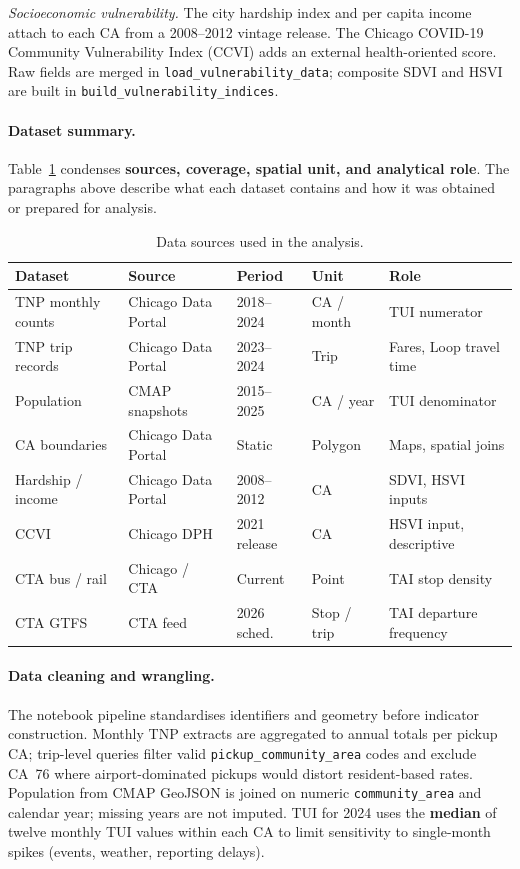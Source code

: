 \documentclass[10pt, a4paper]{article}
\begin{document}
\textit{Socioeconomic vulnerability.} The city hardship index and per capita income \cite{chicago_hardship} attach to each CA from a 2008--2012 vintage release. The Chicago COVID-19 Community Vulnerability Index (CCVI) \cite{chicago_ccvi} adds an external health-oriented score. Raw fields are merged in \texttt{load\_vulnerability\_data}; composite SDVI and HSVI are built in \texttt{build\_vulnerability\_indices}.

\paragraph{Dataset summary.}
Table~\ref{tab:datasets} condenses \textbf{sources, coverage, spatial unit, and analytical role}. The paragraphs above describe what each dataset contains and how it was obtained or prepared for analysis.

\begin{table}[htbp]
    \centering
    \caption{Data sources used in the analysis.}
    \label{tab:datasets}
    \small
    \begin{tabular}{|p{2.2cm}|p{2.5cm}|p{1.6cm}|p{1.4cm}|p{4.2cm}|}
        \hline
        \textbf{Dataset} & \textbf{Source} & \textbf{Period} & \textbf{Unit} & \textbf{Role} \\
        \hline
        TNP monthly counts & Chicago Data Portal & 2018--2024 & CA / month & TUI numerator \\
        TNP trip records & Chicago Data Portal & 2023--2024 & Trip & Fares, Loop travel time \\
        Population & CMAP snapshots & 2015--2025 & CA / year & TUI denominator \\
        CA boundaries & Chicago Data Portal & Static & Polygon & Maps, spatial joins \\
        Hardship / income & Chicago Data Portal & 2008--2012 & CA & SDVI, HSVI inputs \\
        CCVI & Chicago DPH & 2021 release & CA & HSVI input, descriptive \\
        CTA bus / rail & Chicago / CTA & Current & Point & TAI stop density \\
        CTA GTFS & CTA feed & 2026 sched. & Stop / trip & TAI departure frequency \\
        \hline
    \end{tabular}
\end{table}

\paragraph{Data cleaning and wrangling.}
The notebook pipeline standardises identifiers and geometry before indicator construction. Monthly TNP extracts are aggregated to annual totals per pickup CA; trip-level queries filter valid \texttt{pickup\_community\_area} codes and exclude CA~76 where airport-dominated pickups would distort resident-based rates. Population from CMAP GeoJSON is joined on numeric \texttt{community\_area} and calendar year; missing years are not imputed. TUI for 2024 uses the \textbf{median} of twelve monthly TUI values within each CA to limit sensitivity to single-month spikes (events, weather, reporting delays).
\end{document}
